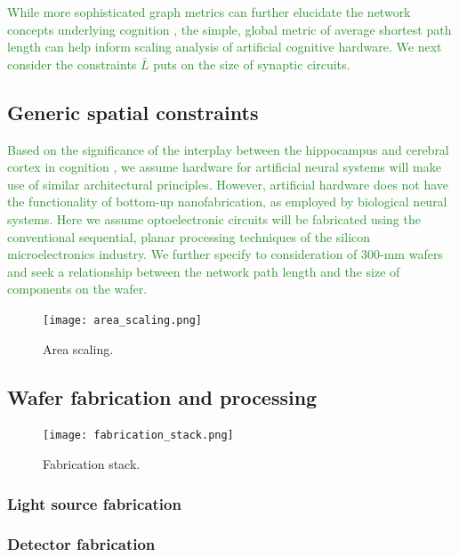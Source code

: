 \documentclass[twocolumn]{article}
\begin{document}
\textcolor{ForestGreen}{While more sophisticated graph metrics can further elucidate the network concepts underlying cognition \cite{busp2009,sp2010}, the simple, global metric of average shortest path length can help inform scaling analysis of artificial cognitive hardware. We next consider the constraints $\bar{L}$ puts on the size of synaptic circuits.}

\subsection{Generic spatial constraints}
\textcolor{ForestGreen}{Based on the significance of the interplay between the hippocampus and cerebral cortex in cognition \cite{}, we assume hardware for artificial neural systems will make use of similar architectural principles. However, artificial hardware does not have the functionality of bottom-up nanofabrication, as employed by biological neural systems. Here we assume optoelectronic circuits will be fabricated using the conventional sequential, planar processing techniques of the silicon microelectronics industry. We further specify to consideration of 300-mm wafers and seek a relationship between the network path length and the size of components on the wafer.}




\textcolor{ForestGreen}{}
\textcolor{ForestGreen}{}
\textcolor{ForestGreen}{}

\begin{figure}
    \centering
    \texttt{[image: area\_scaling.png]}
    \caption{Area scaling.}
    \label{fig:area_scaling}
\end{figure}


\subsection{Wafer fabrication and processing}

\begin{figure}
    \centering
    \texttt{[image: fabrication\_stack.png]}
    \caption{Fabrication stack.}
    \label{fig:fabrication_stack}
\end{figure}

\subsubsection{Light source fabrication}

\subsubsection{Detector fabrication}
\end{document}
